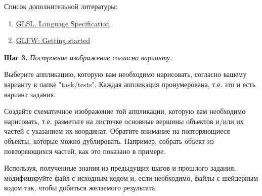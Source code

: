 \documentclass[a4paper,12pt]{article}
\begin{document}
    Список дополнительной литературы:
    
    \begin{enumerate}

    \item 
    \href{https://www.khronos.org/registry/OpenGL/specs/gl/}{GLSL. Language Specification}
    
    \item
    \href{https://www.glfw.org/docs/latest/quick.html}{GLFW: Getting started}

    \end{enumerate}
    
    
    \textbf{Шаг 3.} \textit{Построение изображение согласно варианту.}
    
    Выберите аппликацию, которую вам необходимо нарисовать, согласно вашему варианту в папке "task/tests". Каждая аппликация пронумерована, т.е. это и есть вариант задания.
    
    Создайте схематичное изображение той аппликации, которую вам необходимо нарисовать, т.е. разметьте на листочке основные вершины объектов и/или их частей с указанием их координат. Обратите внимание на повторяющиеся объекты, которые можно дублировать. Например, собрать объект из повторяющихся частей, как это показано в примере.
    
    Используя, полученные знания из предыдущих шагов и прошлого задания, модифицируйте файл с исходным кодом и, если необходимо, файлы с шейдерным кодом так, чтобы добиться желаемого результата.
\end{document}
